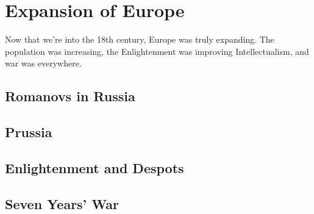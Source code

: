 \chapter{Expansion of Europe}

Now that we're into the 18th century, Europe was truly expanding.
The population was increasing, the Enlightenment was improving Intellectualism,
and war was everywhere.

\section{Romanovs in Russia}

\section{Prussia}

\section{Enlightenment and Despots}

\section{Seven Years' War}
